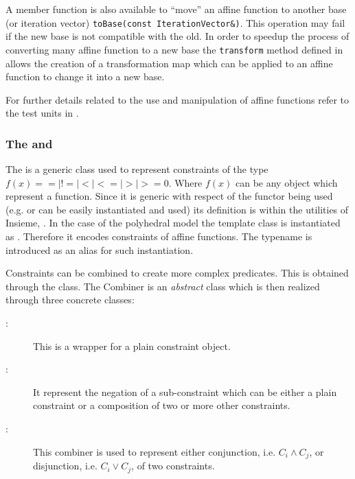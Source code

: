 A member function is also available to ``move'' an affine function to another base
(or iteration vector) {\tt toBase(const IterationVector\&)}. This operation may
fail if the new base is not compatible with the old. In order to speedup the
process of converting many affine function to a new base the {\tt transform}
method defined in  allows the creation of
a transformation map which can be applied to an affine function to change it
into a new base. 

For further details related to the use and manipulation of affine functions
refer to the test units in . 

\subsubsection{The  and } 

The  is a generic class used to represent
constraints of the type $f(x) == | != | < | <= | > | >= 0$. Where $f(x)$ can be
any object which represent a function. Since it is generic with respect of the
functor being used (e.g.  or
 can be easily instantiated and used) its
definition is within the utilities of Insieme,
. In the case of the polyhedral model the
template class is instantiated as .  Therefore
it encodes constraints of affine functions.  The typename 
is introduced as an alias for such instantiation. 

Constraints can be combined to create more complex predicates. This is obtained
through the  class. The Combiner is an {\em abstract} class
which is then realized through three concrete classes:

\begin{description}

	\item[:] This is a wrapper for a plain constraint
		object. 

	\item[:] It represent the negation of a sub-constraint
		which can be either a plain constraint or a composition of two or more
		other constraints. 

	\item[:] This combiner is used to represent either
		conjunction, i.e. $C_i \wedge C_j$, or disjunction, i.e. $C_i \vee C_j$,
		of two constraints. 

\end{description}


